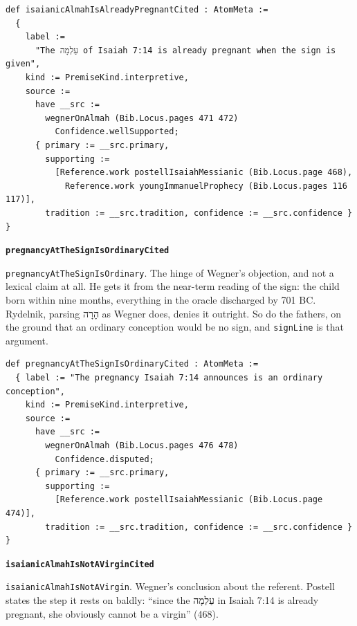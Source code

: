 \documentclass[11pt]{article}
\begin{document}
{\small\begin{verbatim}
def isaianicAlmahIsAlreadyPregnantCited : AtomMeta :=
  {
    label :=
      "The עַלְמָה of Isaiah 7:14 is already pregnant when the sign is given",
    kind := PremiseKind.interpretive,
    source :=
      have __src :=
        wegnerOnAlmah (Bib.Locus.pages 471 472)
          Confidence.wellSupported;
      { primary := __src.primary,
        supporting :=
          [Reference.work postellIsaiahMessianic (Bib.Locus.page 468),
            Reference.work youngImmanuelProphecy (Bib.Locus.pages 116 117)],
        tradition := __src.tradition, confidence := __src.confidence } }
\end{verbatim}}
\par\medskip\noindent\textbf{\texttt{pregnancy\allowbreak{}At\allowbreak{}The\allowbreak{}Sign\allowbreak{}Is\allowbreak{}Ordinary\allowbreak{}Cited}}\par\nobreak\noindent
\texttt{pregnancy\allowbreak{}At\allowbreak{}The\allowbreak{}Sign\allowbreak{}Is\allowbreak{}Ordinary}. The hinge of Wegner’s objection, and not a lexical claim at all. He gets it from the near-term reading of the sign: the child born within nine months, everything in the oracle discharged by 701 BC. Rydelnik, parsing הָרָה as Wegner does, denies it outright. So do the fathers, on the ground that an ordinary conception would be no sign, and \texttt{sign\allowbreak{}Line} is that argument.

{\small\begin{verbatim}
def pregnancyAtTheSignIsOrdinaryCited : AtomMeta :=
  { label := "The pregnancy Isaiah 7:14 announces is an ordinary conception",
    kind := PremiseKind.interpretive,
    source :=
      have __src :=
        wegnerOnAlmah (Bib.Locus.pages 476 478)
          Confidence.disputed;
      { primary := __src.primary,
        supporting :=
          [Reference.work postellIsaiahMessianic (Bib.Locus.page 474)],
        tradition := __src.tradition, confidence := __src.confidence } }
\end{verbatim}}
\par\medskip\noindent\textbf{\texttt{isaianic\allowbreak{}Almah\allowbreak{}Is\allowbreak{}Not\allowbreak{}AVirgin\allowbreak{}Cited}}\par\nobreak\noindent
\texttt{isaianic\allowbreak{}Almah\allowbreak{}Is\allowbreak{}Not\allowbreak{}AVirgin}. Wegner’s conclusion about the referent. Postell states the step it rests on baldly: “since the עַלְמָה in Isaiah 7:14 is already pregnant, she obviously cannot be a virgin” (468).
\end{document}
